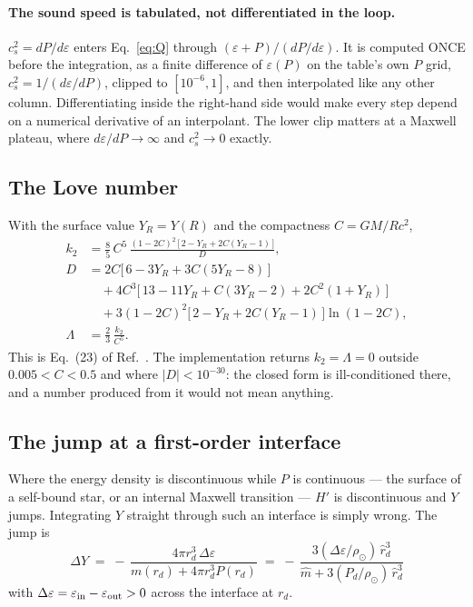 \documentclass[aps,prc,onecolumn,superscriptaddress,nofootinbib,10pt]{revtex4-2}
\newcommand{\rhosol}{\rho_\odot}
\begin{document}
\paragraph{The sound speed is tabulated, not differentiated in the loop.}
$c_s^2 = dP/d\varepsilon$ enters Eq.~\eqref{eq:Q} through
$(\varepsilon+P)/(dP/d\varepsilon)$. It is computed ONCE before the
integration, as a finite difference of $\varepsilon(P)$ on the table's own $P$
grid, $c_s^2 = 1/(d\varepsilon/dP)$, clipped to $[10^{-6}, 1]$, and then
interpolated like any other column. Differentiating inside the right-hand side
would make every step depend on a numerical derivative of an interpolant. The
lower clip matters at a Maxwell plateau, where $d\varepsilon/dP \to \infty$ and
$c_s^2 \to 0$ exactly.

\subsection{The Love number}

With the surface value $Y_R = Y(R)$ and the compactness $C = GM/Rc^2$,
%
\begin{align}
k_2 &= \frac{8}{5}\,C^5\,\frac{(1-2C)^2\,\big[\,2 - Y_R + 2C(Y_R-1)\,\big]}{D} ,
\label{eq:k2}\\[4pt]
D &= 2C\Big[\,6 - 3Y_R + 3C(5Y_R - 8)\,\Big] \nonumber\\
  &\quad + 4C^3\Big[\,13 - 11 Y_R + C(3Y_R - 2) + 2C^2(1 + Y_R)\,\Big]
     \nonumber\\
  &\quad + 3(1-2C)^2\Big[\,2 - Y_R + 2C(Y_R-1)\,\Big]\ln(1-2C) ,
\label{eq:k2den}\\[4pt]
\Lambda &= \frac{2}{3}\,\frac{k_2}{C^5} .
\label{eq:Lambda}
\end{align}
%
This is Eq.~(23) of Ref.~\cite{Hinderer2008}. The implementation returns
$k_2 = \Lambda = 0$ outside $0.005 < C < 0.5$ and where $|D| < 10^{-30}$: the
closed form is ill-conditioned there, and a number produced from it would not
mean anything.

\subsection{The jump at a first-order interface}
\label{sec:jump}

Where the energy density is discontinuous while $P$ is continuous --- the
surface of a self-bound star, or an internal Maxwell transition --- $H'$ is
discontinuous and $Y$ jumps. Integrating $Y$ straight through such an
interface is simply wrong. The jump is
%
\begin{equation}
\boxed{\;
\Delta Y \;=\; -\,\frac{4\pi r_d^3\, \Delta\varepsilon}
                       {m(r_d) + 4\pi r_d^3 P(r_d)}
 \;=\; -\,\frac{3(\Delta\varepsilon/\rhosol)\,\hat r_d^3}
               {\hat m + 3 (P_d/\rhosol)\,\hat r_d^3} \;}
\label{eq:dY}
\end{equation}
%
with $\Delta\varepsilon = \varepsilon_{\rm in} - \varepsilon_{\rm out} > 0$
across the interface at $r_d$.
\end{document}
